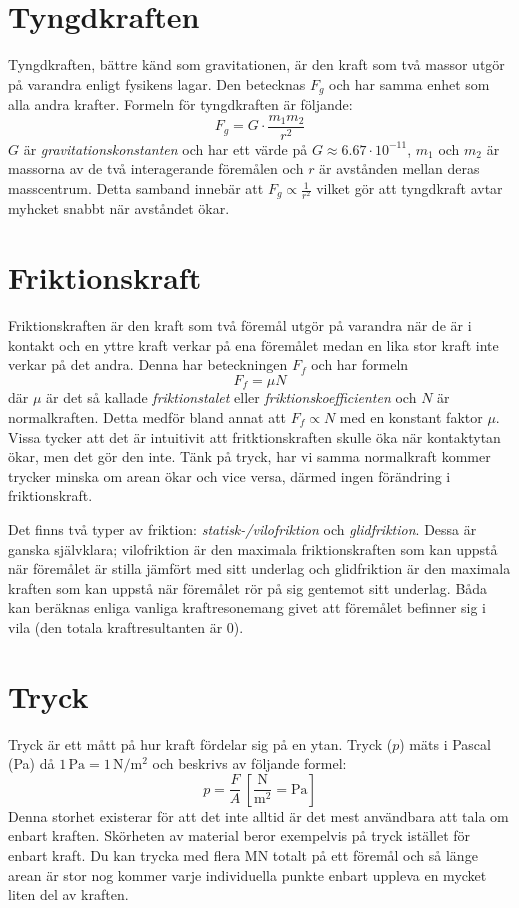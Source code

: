 \section{Tyngdkraften}
Tyngdkraften, bättre känd som gravitationen, är den kraft som två massor utgör på varandra enligt fysikens lagar. Den betecknas $F_g$ och har samma enhet som alla andra krafter. Formeln för tyngdkraften är följande:
\begin{equation*}
    F_g = G \cdot \frac{m_1m_2}{r^2}
\end{equation*}
$G$ är \emph{gravitationskonstanten} och har ett värde på $G \approx 6.67 \cdot 10^{-11}$, $m_1$ och $m_2$ är massorna av de två interagerande föremålen och $r$ är avstånden mellan deras masscentrum. Detta samband innebär att $F_g \hyperref[def:propto]{\propto} \frac{1}{r^2}$ vilket gör att tyngdkraft avtar myhcket snabbt när avståndet ökar.

\section{Friktionskraft}
Friktionskraften är den kraft som två föremål utgör på varandra när de är i kontakt och en yttre kraft verkar på ena föremålet medan en lika stor kraft inte verkar på det andra. Denna har beteckningen $F_f$ och har formeln
\begin{equation*}
    F_f = \mu N
\end{equation*}
där $\mu$ är det så kallade \emph{friktionstalet} eller \emph{friktionskoefficienten} och $N$ är normalkraften. Detta medför bland annat att $F_f \hyperref[def:propto]{\propto} N$ med en konstant faktor $\mu$. Vissa tycker att det är intuitivit att fritktionskraften skulle öka när kontaktytan ökar, men det gör den inte. Tänk på tryck, har vi samma normalkraft kommer trycker minska om arean ökar och vice versa, därmed ingen förändring i friktionskraft.

Det finns två typer av friktion: \emph{statisk-/vilofriktion} och \emph{glidfriktion}. Dessa är ganska självklara; vilofriktion är den maximala friktionskraften som kan uppstå när föremålet är stilla jämfört med sitt underlag och glidfriktion är den maximala kraften som kan uppstå när föremålet rör på sig gentemot sitt underlag. Båda kan beräknas enliga vanliga kraftresonemang givet att föremålet befinner sig i vila (den totala kraftresultanten är 0).

\section{Tryck}
Tryck är ett mått på hur kraft fördelar sig på en ytan. Tryck ($p$) mäts i Pascal (Pa) då $1\,\mathrm{Pa} = 1 \, \mathrm{N} / \mathrm{m^2}$ och beskrivs av följande formel:
\begin{equation*}
    p = \frac{F}{A} \, \left[\frac{\mathrm{N}}{\mathrm{m^2}} = \mathrm{Pa}\right]
\end{equation*}
Denna storhet existerar för att det inte alltid är det mest användbara att tala om enbart kraften. Skörheten av material beror exempelvis på tryck istället för enbart kraft. Du kan trycka med flera MN totalt på ett föremål och så länge arean är stor nog kommer varje individuella punkte enbart uppleva en mycket liten del av kraften.

